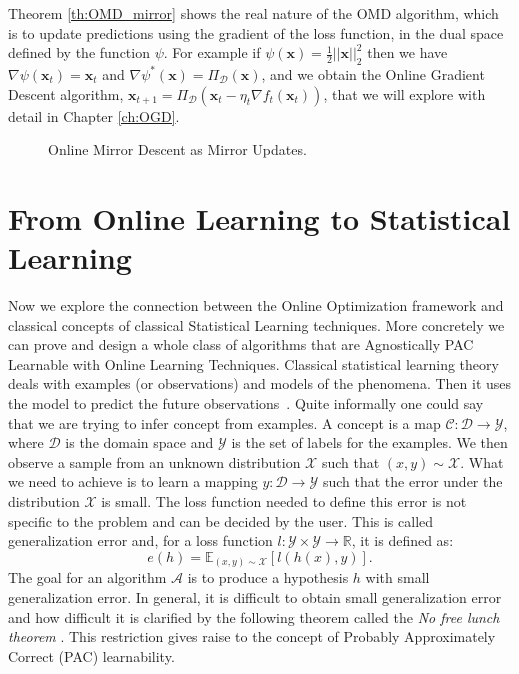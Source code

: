 Theorem \ref{th:OMD_mirror} shows the real nature of the OMD algorithm, which is to up{}date predictions using the gradient of the loss function, in the dual space defined by the function $\psi$. For example if $\psi(\mathbf x)=\frac{1}{2}||\mathbf x||_2^2$ then we have $\nabla \psi(\mathbf x_t)=\mathbf x_t$ and $\nabla \psi^*(\mathbf x)=\Pi_\mathcal D(\mathbf x)$, and we obtain the Online Gradient Descent algorithm, $\mathbf x_{t+1}=\Pi_\mathcal D(\mathbf x_t-\eta_t\nabla f_t(\mathbf x_t))$, that we will explore with detail in Chapter \ref{ch:OGD}.

\begin{figure}[!ht]
\centering

\caption{Online Mirror Descent as Mirror Updates.}
\label{fig:OMD_mirror}
\end{figure}



\section{From Online Learning to Statistical Learning}\label{sec:stat_learning}
Now we explore the connection between the Online Optimization framework and classical concepts of classical Statistical Learning techniques. More concretely we can prove and design a whole class of algorithms that are Agnostically PAC Learnable with Online Learning Techniques. 
Classical statistical learning theory deals with examples (or observations) and models of the phenomena. Then it uses the model to predict the future observations~\cite{bousquet2003introduction}. Quite informally one could say that we are trying to infer concept from examples. A concept is a map $\mathcal C:\mathcal D\to\mathcal Y$, where $\mathcal D$ is the domain space and $\mathcal Y$ is the set of labels for the examples. We then observe a sample from an unknown distribution $\mathcal X$ such that $(x,y)\sim \mathcal X$. What we need to achieve is to learn a mapping $y:\mathcal D\to\mathcal Y$ such that the error under the distribution $\mathcal X$ is small. The loss function needed to define this error is not specific to the problem and can be decided by the user. This is called generalization error and, for a loss function $l:\mathcal Y\times\mathcal Y \to\mathbb R$, it is defined as:
\begin{equation}\label{eq:generalization}
    e(h) = \mathbb E_{(x,y)\sim \mathcal X}[l(h(x),y)].
\end{equation}
The goal for an algorithm $\mathcal A$ is to produce a hypothesis $h$ with small generalization error. 
In general, it is difficult to obtain small generalization error and how difficult it is clarified by the following theorem called the \emph{No free lunch theorem} \cite{mitchell1997machine}.
This restriction gives raise to the concept of Probably Approximately Correct (PAC) learnability. 

